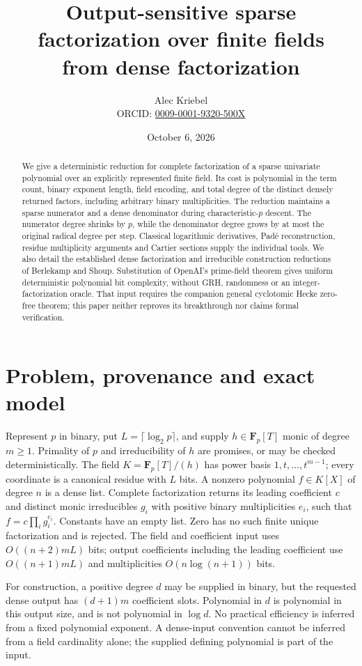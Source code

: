 \documentclass[11pt]{article}
\title{Output-sensitive sparse factorization over finite fields\\from dense factorization}
\author{Alec Kriebel\\\small ORCID: \href{https://orcid.org/0009-0001-9320-500X}{0009-0001-9320-500X}}
\date{October 6, 2026}
\newcommand{\Fp}{\mathbf F_p}
\begin{document}
\maketitle
\begin{abstract}
We give a deterministic reduction for complete factorization of a sparse
univariate polynomial over an explicitly represented finite field. Its cost
is polynomial in the term count, binary exponent length, field encoding,
and total degree of the distinct densely returned factors, including arbitrary
binary multiplicities. The reduction maintains a sparse numerator and a dense
denominator during characteristic-$p$ descent. The numerator degree shrinks
by $p$, while the denominator degree grows by at most the original radical
degree per step. Classical logarithmic derivatives, Pad\'e reconstruction,
residue multiplicity arguments and Cartier sections supply the individual
tools. We also detail the established dense factorization and irreducible
construction reductions of Berlekamp and Shoup. Substitution of OpenAI's
prime-field theorem gives uniform deterministic polynomial bit complexity,
without GRH, randomness or an integer-factorization oracle. That input
requires the companion general cyclotomic Hecke zero-free theorem; this
paper neither reproves its breakthrough nor claims formal verification.
\end{abstract}

\section{Problem, provenance and exact model}
Represent $p$ in binary, put $L=\lceil\log_2p\rceil$, and supply
$h\in\Fp[T]$ monic of degree $m\ge1$. Primality of $p$ and irreducibility
of $h$ are promises, or may be checked deterministically. The field
$K=\Fp[T]/(h)$ has power basis $1,t,\ldots,t^{m-1}$; every coordinate
is a canonical residue with $L$ bits. A nonzero polynomial $f\in K[X]$
of degree $n$ is a dense list. Complete factorization returns its leading
coefficient $c$ and distinct monic irreducibles $g_i$ with positive binary
multiplicities $e_i$, such that $f=c\prod_i g_i^{e_i}$. Constants have an
empty list. Zero has no such finite unique factorization and is rejected.
The field and coefficient input uses $O((n+2)mL)$ bits; output coefficients
including the leading coefficient use $O((n+1)mL)$ and multiplicities
$O(n\log(n+1))$ bits.

For construction, a positive degree $d$ may be supplied in binary, but the
requested dense output has $(d+1)m$ coefficient slots. Polynomial in $d$
is polynomial in this output size, and is not polynomial in $\log d$.
No practical efficiency is inferred from a fixed polynomial exponent.
A dense-input convention cannot be inferred from a field cardinality alone;
the supplied defining polynomial is part of the input.
\end{document}
